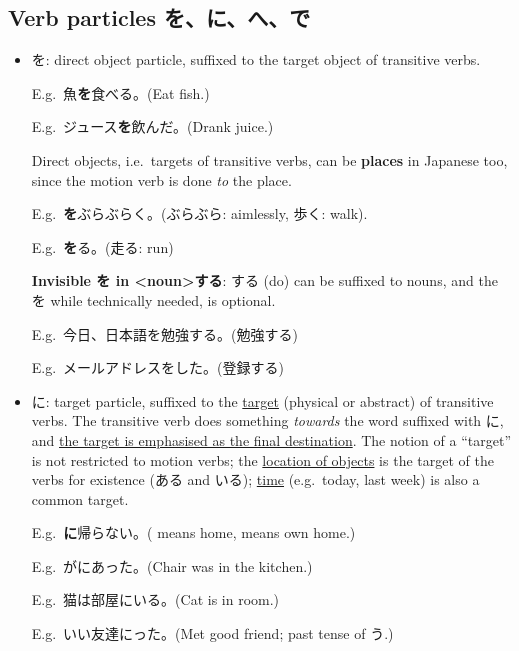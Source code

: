 \documentclass[../nihongo-gakushuu-kyouzai.tex]{subfiles}
\begin{document}
\subsection{Verb particles を、に、へ、で}
\begin{itemize}
    \item を: direct object particle, suffixed to the target object of transitive verbs.

    E.g.\ 魚\textbf{を}食べる。(Eat fish.)

    E.g.\ ジュース\textbf{を}飲んだ。(Drank juice.)

    Direct objects, i.e.\ targets of transitive verbs, can be \textbf{places} in Japanese too, since the motion verb is done \emph{to} the place.

    E.g.\ \textbf{を}ぶらぶらく。(ぶらぶら: aimlessly, 歩く: walk).

    E.g.\ \textbf{を}る。(走る: run)

    \textbf{Invisible を in <noun>する}: する (do) can be suffixed to nouns, and the を while technically needed, is optional.

    E.g.\ 今日、日本語を勉強\cancel{[を]}する。(勉強\cancel{[を]}する)

    E.g.\ メールアドレスを\cancel{[を]}した。(登録\cancel{[を]}する)
    \item に: target particle, suffixed to the \ul{target} (physical or abstract) of transitive verbs. The transitive verb does something \emph{towards} the word suffixed with に, and \ul{the target is emphasised as the final destination}. The notion of a ``target'' is not restricted to motion verbs; the \ul{location of objects} is the target of the verbs for existence (ある and いる); \ul{time} (e.g.\ today, last week) is also a common target.


    E.g.\ \textbf{に}帰らない。( means home,  means own home.)


    E.g.\ がにあった。(Chair was in the kitchen.)

    E.g.\ 猫は部屋にいる。(Cat is in room.)

    E.g.\ いい友達にった。(Met good friend; past tense of う.)


\end{itemize}
\end{document}

